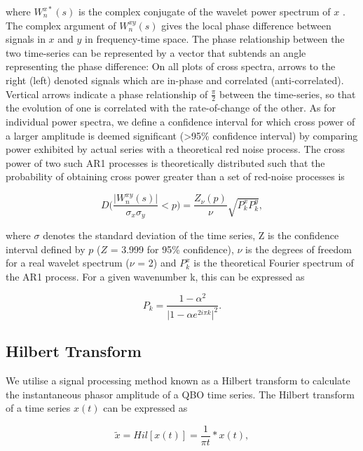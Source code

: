 where $W^{x*}_n(s)$ is the complex conjugate of the wavelet power spectrum of $x$ \citep{Grinstead2004}. The complex argument of $W^{xy}_n(s)$ gives the local phase difference between signals in $x$ and $y$ in frequency-time space. The phase relationship between the two time-series can be represented by a
vector that subtends an angle representing the phase difference: On all plots of cross spectra, arrows to the right (left) denoted signals which are in-phase and correlated (anti-correlated). Vertical arrows indicate a phase relationship of $\frac{\pi}{2}$ between the time-series, so that the evolution of
one is correlated with the rate-of-change of the other. As for individual power spectra, we define a confidence interval for which cross power of a larger amplitude is deemed significant (>95\% confidence interval) by comparing power exhibited by actual series with a theoretical red noise process. The cross power of two such AR1 processes is theoretically distributed such that the probability of obtaining cross power greater than a set of red-noise processes is

\begin{equation} \label{wavelet_cross_dist}
D\bigg(\frac{\vert W^{xy}_n(s)\vert}{\sigma_x \sigma_y} < p\bigg) = \frac{Z_\nu(p)}{\nu} \sqrt{P^x_k P^y_k},
\end{equation}

where $\sigma$ denotes the standard deviation of the time series, Z is the confidence interval defined by $p$ ($Z$ = 3.999 for 95\% confidence), $\nu$ is the degrees of freedom for a real wavelet spectrum ($\nu$ = 2) and $P^x_k$ is the theoretical Fourier spectrum of the AR1 process. For a given wavenumber k, this can be expressed as

\begin{equation} \label{theoretical_fourier}
P_k = \frac{1 - \alpha^2}{\vert 1 - \alpha e^{2i\pi k} \vert^2}.
\end{equation}

\subsection{Hilbert Transform}
We utilise a signal processing method known as a Hilbert transform to calculate the instantaneous phasor amplitude of a QBO time series. The Hilbert transform of a time series $x(t)$ can be expressed as

\begin{equation} \label{theoretical_fourier}
\tilde{x} = Hil[x(t)] = \frac{1}{\pi t} * x(t),
\end{equation}

